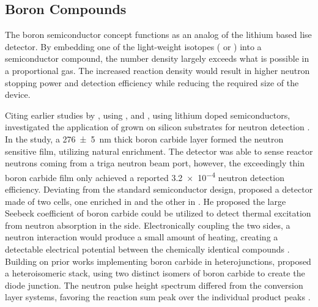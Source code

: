 \documentclass[../../../main.tex]{subfiles}
\begin{document}
%
    \subsection{Boron Compounds}%
    \label{sec:chapter-2:semiconductor-detectors:boron-compounds}%
    The boron semiconductor concept functions as an analog of the lithium based \gls{lise} detector.
    By embedding one of the light-weight isotopes ( or ) into a semiconductor compound, the number density largely exceeds what is possible in a proportional gas.
    The increased reaction density would result in higher neutron stopping power and detection efficiency while reducing the required size of the device.
    \par%
    Citing earlier studies by \citeauthor*{Kumashiro_1988}, using , and \citeauthor*{Bykovskii_1993}, using lithium doped  semiconductors, \citeauthor*{Robertson_2002} investigated the application of  grown on silicon substrates for neutron detection \cite{Kumashiro_1988, Bykovskii_1993, Robertson_2002}.
    In the study, a \SI{276(5)}{\nano\meter} thick boron carbide layer formed the neutron sensitive film, utilizing natural  enrichment.
    The detector was able to sense reactor neutrons coming from a \gls{triga} neutron beam port, however, the exceedingly thin boron carbide film only achieved a reported \num{3.2e-4} neutron detection efficiency.
    Deviating from the standard semiconductor design, \citeauthor*{Emin_2005} proposed a detector made of two cells, one enriched in  and the other in .
    He proposed the large Seebeck coefficient of boron carbide could be utilized to detect thermal excitation from neutron absorption in the  side.
    Electronically coupling the two sides, a neutron interaction would produce a small amount of heating, creating a detectable electrical potential between the chemically identical compounds \cite{Emin_2005}.
    Building on prior works implementing boron carbide in heterojunctions, \citeauthor*{Caruso_2006} proposed a heteroisomeric stack, using two distinct isomers of boron carbide to create the diode junction.
    The neutron pulse height spectrum differed from the conversion layer systems, favoring the reaction sum peak over the individual product peaks \cite{Caruso_2006}.
\end{document}
